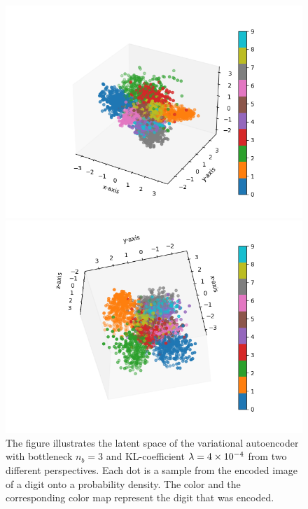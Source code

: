 \begin{figure}
\begin{center}
   \begin{minipage}[b]{0.49\linewidth}
      \includegraphics[trim = 20mm 10mm 20mm 10mm, clip, width=\linewidth]{convolutional_VAE_snd_KL_4e-4_10k_epochs_3D_latent_1}
	\end{minipage}
   \begin{minipage}[b]{0.49\linewidth}
      \includegraphics[trim = 20mm 10mm 20mm 10mm, clip, width=\linewidth]{convolutional_VAE_snd_KL_4e-4_10k_epochs_3D_latent_2}
	\end{minipage}
\end{center}
\caption{The figure illustrates the latent space of the variational autoencoder with bottleneck $n_b=3$ and KL-coefficient $\lambda = \num{4e-4}$ from two different perspectives. Each dot is a sample from the encoded image of a digit onto a probability density. The color and the corresponding color map represent the digit that was encoded.}\label{fig:convolutional_VAE_snd_KL_4e-4_10k_epochs_3D_latent}
\end{figure}


